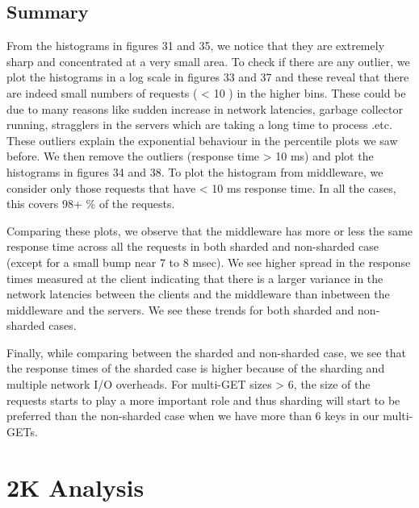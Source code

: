\documentclass[11pt,a4paper]{article}
\newcommand\instructions[1]{\textcolor{blue}{Instructions: #1}}
\begin{document}
\subsection{Summary}


From the histograms in figures 31 and 35, we notice that they are extremely sharp and concentrated at a very small area. To check if there are any outlier, we plot the histograms in a log scale in figures 33 and 37 and these reveal that there are indeed small numbers of requests ( < 10 ) in the higher bins. These could be due to many reasons like sudden increase in network latencies, garbage collector running, stragglers in the servers which are taking a long time to process .etc. These outliers explain the exponential behaviour in the percentile plots we saw before. We then remove the outliers (response time > 10 ms) and plot the histograms in figures 34 and 38. 
To plot the histogram from middleware, we consider only those requests that have < 10 ms response time. In all the cases, this covers 98+ \% of the requests.

Comparing these plots, we observe that the middleware has more or less the same response time across all the requests in both sharded and non-sharded case (except for a small bump near 7 to 8 msec). We see higher spread in the response times measured at the client indicating that there is a larger variance in the network latencies between the clients and the middleware than inbetween the middleware and the servers. We see these trends for both sharded and non-sharded cases.

Finally, while comparing between the sharded and non-sharded case, we see that the response times of the sharded case is higher because of the sharding and multiple network I/O overheads. For multi-GET sizes > 6, the size of the requests starts to play a more important role and thus sharding will start to be preferred than the non-sharded case when we have more than 6 keys in our multi-GETs.


\section{2K Analysis}
\end{document}
